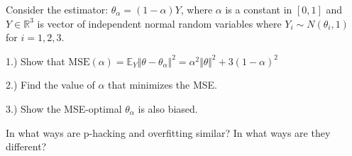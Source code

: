 \begin{tcolorbox}[breakable, size=fbox, boxrule=1pt, pad at break*=1mm,colback=cellbackground, colframe=cellborder, title=Exercise: James-Stein Estimator]
Consider the estimator: $\theta_\alpha = (1 - \alpha)Y$, where $\alpha$ is a constant in $[0,1]$ and $Y\in \mathbb{R}^3$ is vector of independent normal random variables where $Y_i\sim N(\theta_i, 1)$ for $i=1,2,3$.

1.) Show that $\mathrm{MSE}(\alpha) = \mathbb{E}_Y \Vert \theta - \theta_\alpha \Vert^2  = \alpha^2 \Vert \theta \Vert^2 + 3(1-\alpha)^2 $

2.) Find the value of $\alpha$ that minimizes the MSE.

3.) Show the MSE-optimal $\theta_\alpha$ is also biased.
\end{tcolorbox}

\begin{tcolorbox}[breakable, size=fbox, boxrule=1pt, pad at break*=1mm,colback=cellbackground, colframe=cellborder, title=Exercise: P-hacking vs Overfitting]
In what ways are p-hacking and overfitting similar? In what ways are they different?
\end{tcolorbox}